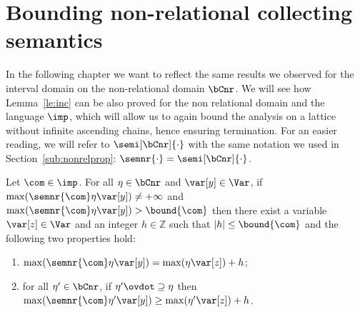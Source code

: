\section{Bounding non-relational collecting semantics}\label{sec:computingnonrel}

In the following chapter we want to reflect the same results we
observed for the interval domain on the non-relational domain
\(\bCnr\). We will see how Lemma~\ref{le:inc} can be also proved for
the non relational domain and the language \(\imp\), which will allow
us to again bound the analysis on a lattice without infinite ascending
chains, hence ensuring termination.  For an easier reading, we will
refer to \(\semi[\bCnr]{\cdot}\) with the same notation we used in
Section~\ref{sub:nonrelprop}: \(\semnr{\cdot} = \semi[\bCnr]{\cdot}\).

\begin{lemma}\label{le:incnr}
  Let \(\com\in \imp\).
  For all \(\eta \in \bCnr\) and \(\var[y] \in \Var\), if
  \(\max(\semnr{\com} \eta \var[y]) \neq +\infty\) and
  \(\max(\semnr{\com}\eta \var[y]) > \bound{\com}\) then there exist a
  variable \(\var[z] \in \Var\) and an integer \(h \in \mathbb{Z}\)
  such that \(|h| \leq \bound{\com}\) and the following two properties
  hold:
  \begin{enumerate}[label=(\roman*)]
  \item\label{point1nr} \(\max(\semnr{\com}\eta \var[y]) = \max(\eta \var[z]) + h\); 
  \item\label{point2nr} for all \(\eta' \in \bCnr\), if
    \(\eta' \ovdot\supseteq \eta\)
    then
    \(\max(\semnr{\com}\eta' \var[y]) \geq \max(\eta' \var[z]) + h\).
  \end{enumerate}
\end{lemma}

